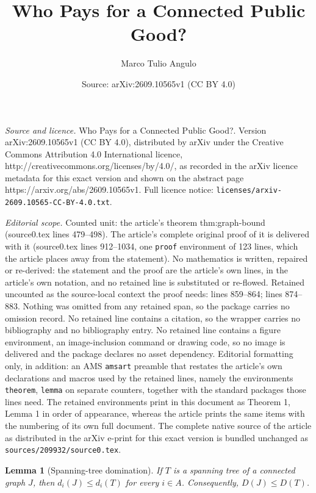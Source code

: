 \documentclass[10pt,a4paper]{amsart}
\title{Who Pays for a Connected Public Good?}
\author{Marco Tulio Angulo}
\date{Source: arXiv:2609.10565v1 (CC BY 4.0)}
\newtheorem{lemma}{Lemma}
\begin{document}
\maketitle

\noindent\emph{Source and licence.} Who Pays for a Connected Public Good?. Version arXiv:2609.10565v1 (CC BY 4.0), distributed by arXiv under the Creative Commons Attribution 4.0 International licence, http://creativecommons.org/licenses/by/4.0/, as recorded in the arXiv licence metadata for this exact version and shown on the abstract page https://arxiv.org/abs/2609.10565v1. Full licence notice: \texttt{licenses/arxiv-2609.10565-CC-BY-4.0.txt}.\par\smallskip

\noindent\textit{Editorial scope.} Counted unit: the article's theorem thm:graph-bound (source0.tex lines 479--498). The article's complete original proof of it is delivered with it (source0.tex lines 912--1034, one \texttt{proof} environment of 123 lines, which the article places away from the statement). No mathematics is written, repaired or re-derived: the statement and the proof are the article's own lines, in the article's own notation, and no retained line is substituted or re-flowed.  Retained uncounted as the source-local context the proof needs: lines 859--864; lines 874--883.  Nothing was omitted from any retained span, so the package carries no omission record.  No retained line contains a citation, so the wrapper carries no bibliography and no bibliography entry.  No retained line contains a figure environment, an image-inclusion command or drawing code, so no image is delivered and the package declares no asset dependency.  Editorial formatting only, in addition: an AMS \texttt{amsart} preamble that restates the article's own declarations and macros used by the retained lines, namely the environments \texttt{theorem}, \texttt{lemma} on separate counters, together with the standard packages those lines need.  The retained environments print in this document as Theorem 1, Lemma 1 in order of appearance, whereas the article prints the same items with the numbering of its own full document.  The complete native source of the article as distributed in the arXiv e-print for this exact version is bundled unchanged as \texttt{sources/209932/source0.tex}.
\begin{lemma}[Spanning-tree domination]
\label{lem:spanning}
If \(T\) is a spanning tree of a connected graph \(J\), then
\(d_i(J)\leq d_i(T)\) for every \(i\in A\). Consequently,
\(D(J)\leq D(T)\).
\end{lemma}
\end{document}
